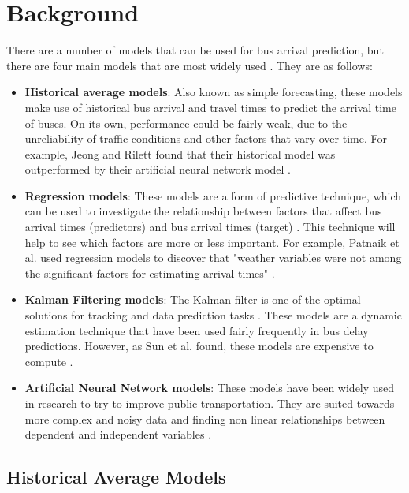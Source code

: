\section{Background}

There are a number of models that can be used for bus arrival prediction, but there are four main models that are most widely used \cite{dynamic-gps}. They are as follows: 
\begin{itemize}
    \item \textbf{Historical average models}: Also known as simple forecasting, these models make use of historical bus arrival and travel times to predict the arrival time of buses. On its own, performance could be fairly weak, due to the unreliability of traffic conditions and other factors that vary over time. For example, Jeong and Rilett found that their historical model was outperformed by their artificial neural network model \cite{ann-prediction}.
    \item \textbf{Regression models}: These models are a form of predictive technique, which can be used to investigate the relationship between factors that affect bus arrival times (predictors) and bus arrival times (target) \cite{regression-techniques}. This technique will help to see which factors are more or less important. For example, Patnaik et al. used regression models to discover that "weather variables were not among the significant factors for estimating arrival times" \cite{apc-estimation}. 
    \item \textbf{Kalman Filtering models}: The Kalman filter is one of the optimal solutions for tracking and data prediction tasks \cite{kalman-mit}. These models are a dynamic estimation technique that have been used fairly frequently in bus delay predictions. However, as Sun et al. found, these models are expensive to compute \cite{smart-public-transport}.
    \item \textbf{Artificial Neural Network models}: These models have been widely used in research to try to improve public transportation. They are suited towards more complex and noisy data and finding non linear relationships between dependent and independent variables \cite{dynamic-gps}. 
\end{itemize}

\subsection{Historical Average Models}
\label{section:historical-avg-models-research}

